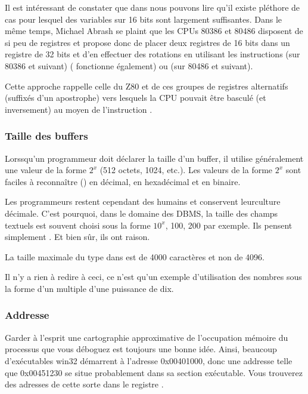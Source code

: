 Il est intéressant de constater que dans 
nous pouvons lire qu'il existe pléthore de cas pour lesquel des variables sur 16 bits sont largement suffisantes.
Dans le même temps, Michael Abrash se plaint que les CPUs 80386 et 80486 disposent de si peu de registres et propose donc de
placer deux registres de 16 bits dans un registre de 32 bits et d'en effectuer des rotations en utilisant les instructions
 (sur 80386 et suivant) ( fonctionne également) ou 
 (sur 80486 et suivant).

Cette approche rappelle celle du Z80 et de ces groupes de registres alternatifs (suffixés d'un apostrophe)
vers lesquels la CPU pouvait être basculé (et inversement) au moyen de l'instruction .

\subsubsection{Taille des buffers}

Lorssqu'un programmeur doit déclarer la taille d'un buffer, il utilise généralement une valeur de la
forme $2^x$ (512 octets, 1024, etc.).
Les valeurs de la forme $2^x$ sont faciles à reconnaître () en décimal, en hexadécimal
et en binaire.

Les programmeurs restent cependant des humains et conservent leurculture décimale.
C'est pourquoi, dans le domaine des \ac{DBMS}, la taille des champs textuels est souvent choisi sous la forme $10^x$,
100, 200 par exemple.
Ils pensent simplement .
Et bien sûr, ils ont raison.

La taille maximale du type  dans \oracle est de 4000 caractères et non de 4096.

Il n'y a rien à redire à ceci, ce n'est qu'un exemple d'utilisation des nombres sous la forme d'un
multiple d'une puissance de dix.

\subsubsection{Addresse}

Garder à l'esprit une cartographie approximative de l'occupation mémoire du processus que vous
déboguez est toujours une bonne idée.
Ainsi, beaucoup d'exécutables win32 démarrent à l'adresse 0x00401000, donc une addresse telle que
0x00451230 se situe probablement dans sa section exécutable. Vous trouverez des adresses de cette
sorte dans le registre .


